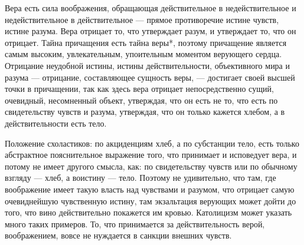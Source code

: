 \documentclass[12pt,oneside]{book}
\begin{document}
Вера есть сила воображения, обращающая действительное в недействительное и недействительное в действительное --- прямое противоречие истине чувств, истине разума. Вера отрицает то, что утверждает разум, и утверждает то, что он отрицает\ddag\let\svthefootnote\thefootnote\let\thefootnote\relax{}\let\thefootnote\svthefootnote. Тайна причащения есть тайна веры*\let\svthefootnote\thefootnote\let\thefootnote\relax{}\let\thefootnote\svthefootnote, поэтому причащение является самым высоким, увлекательным, упоительным моментом верующего сердца. Отрицание неудобной истины, истины действительности, объективного мира и разума --- отрицание, составляющее сущность веры, --- достигает своей высшей точки в причащении, так как здесь вера отрицает непосредственно сущий, очевидный, несомненный объект, утверждая, что он есть не то, что есть по свидетельству чувств и разума, утверждая, что он только кажется хлебом, а в действительности есть тело.

Положение схоластиков: по акциденциям хлеб, а по субстанции тело, есть только абстрактное пояснительное выражение того, что принимает и исповедует вера, и потому не имеет другого смысла, как: по свидетельству чувств или по обычному взгляду --- хлеб, а воистину --- тело. Поэтому не удивительно, что там, где воображение имеет такую власть над чувствами и разумом, что отрицает самую очевиднейшую чувственную истину, там экзальтация верующих может дойти до того, что вино действительно покажется им кровью. Католицизм может указать много таких примеров. То, что принимается за действительность верой, воображением, вовсе не нуждается в санкции внешних чувств.
\end{document}
